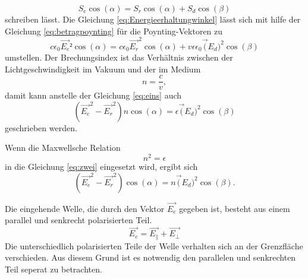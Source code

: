 \begin{equation}
    S_e \cos(\alpha) = S_r \cos(\alpha) +  S_d \cos(\beta)
    \label{eq:Energieerhaltungwinkel}
\end{equation}
schreiben lässt.
Die Gleichung \eqref{eq:Energieerhaltungwinkel} lässt sich mit hilfe der Gleichung \eqref{eq:betragpoynting} für die Poynting-Vektoren zu 
\begin{equation}
    c \epsilon_0 \vec{E_e}² \cos(\alpha) = c \epsilon_0 \vec{E_r}^2 \cos(\alpha) + v \epsilon \epsilon_0 \vec(E_d)^2 \cos(\beta)
    \label{eq:eins}
\end{equation}
umstellen. Der Brechungsindex ist das Verhältnis zwischen der Lichtgeschwindigkeit im Vakuum und der im Medium 
\begin{equation}
    n = \dfrac{c}{v} ,
    \label{eq:Brechungsindex}
\end{equation}
damit kann anstelle der Gleichung \eqref{eq:eins} auch 
\begin{equation}
    (\vec{E_e}^2  - \vec{E_r}^2)n \cos(\alpha) = \epsilon \vec(E_d)^2 \cos(\beta)
    \label{eq:zwei}
\end{equation}
geschrieben werden.

Wenn die Maxwellsche Relation
\begin{equation*}
    n^2 = \epsilon
    \label{eq:Maxwellschrelation}
\end{equation*}
in die Gleichung \eqref{eq:zwei} eingesetzt wird, ergibt sich 
\begin{equation}
    (\vec{E_e}^2  - \vec{E_r}^2) \cos(\alpha) = n \vec(E_d)^2 \cos(\beta).
    \label{eq:drei}
\end{equation}

Die eingehende Welle, die durch den Vektor $\vec{E_e}$ gegeben ist, besteht aus einem parallel und senkrecht polarisierten Teil.
\begin{equation*}
    \vec{E_e} = \vec{E_\parallel}  + \vec{E_\perp}
    \label{eq:vier}
\end{equation*}
Die unterschiedlich polarisierten Teile der Welle verhalten sich an der Grenzfläche verschieden.
Aus diesem Grund ist es notwendig den parallelen und senkrechten Teil seperat zu betrachten. 

\subject{Senkrecht Polarisation}
\label{senkrechtpolarisation}

